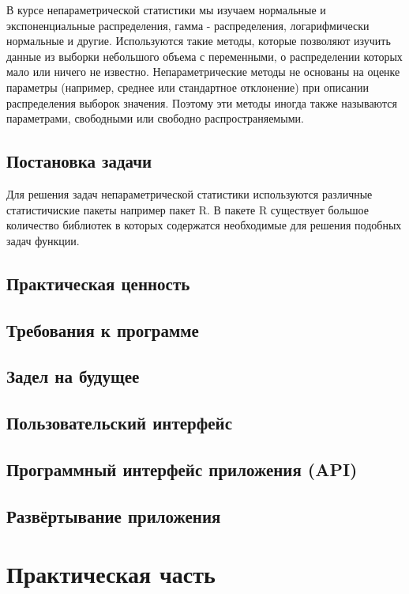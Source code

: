 \documentclass[14pt,a4paper]{scrartcl}
\begin{document}
    В курсе непараметрической статистики мы изучаем
    нормальные и экспоненциальные распределения, гамма - распределения, логарифмически нормальные и другие.
    Используются такие методы, которые позволяют изучить данные из выборки небольшого объема с переменными,
    о распределении которых мало или ничего не известно. Непараметрические методы не основаны на оценке
    параметры (например, среднее или стандартное отклонение) при описании распределения выборок
    значения. Поэтому эти методы иногда также называются параметрами, свободными или свободно распространяемыми.

    \subsection[Постановка задачи]{Постановка задачи}
    Для решения задач непараметрической статистики используются различные статистичиские пакеты например пакет R.
    В пакете R существует большое количество библиотек в которых содержатся необходимые для решения подобных задач функции.

    \subsection[Актуальность]{Практическая ценность}
    \subsection[Требования к программе]{Требования к программе}
    \subsection[Новизна]{Задел на будущее}
    \subsection[Пользовательский интерфейс]{Пользовательский интерфейс}
    \subsection[Программный интерфейс приложения]{Программный интерфейс приложения (API)}
    \subsection[Развёртывание приложения]{Развёртывание приложения}

    \newpage
    \section[Практическая часть]{Практическая часть}
\end{document}
